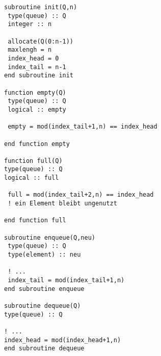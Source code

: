 \begin{lstlisting}
subroutine init(Q,n)
 type(queue) :: Q
 integer :: n
 
 allocate(Q(0:n-1))
 maxlengh = n
 index_head = 0
 index_tail = n-1
end subroutine init

function empty(Q)
 type(queue) :: Q
 logical :: empty
 
 empty = mod(index_tail+1,n) == index_head

end function empty

function full(Q)
type(queue) :: Q
logical :: full

 full = mod(index_tail+2,n) == index_head
 ! ein Element bleibt ungenutzt

end function full

subroutine enqueue(Q,neu)
 type(queue) :: Q
 type(element) :: neu
 
 ! ...
 index_tail = mod(index_tail+1,n)
end subroutine enqueue

subroutine dequeue(Q)
type(queue) :: Q

! ...
index_head = mod(index_head+1,n)
end subroutine dequeue
\end{lstlisting}